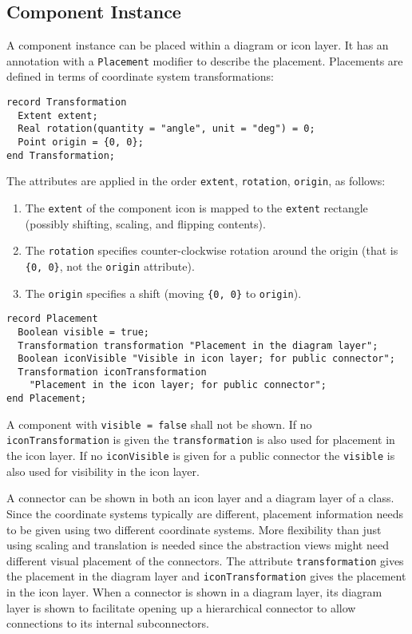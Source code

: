 \subsection{Component Instance}\label{component-instance}

A component instance can be placed within a diagram or icon layer.
It has an annotation with a \lstinline!Placement! modifier to describe the placement.
Placements are defined in terms of coordinate system transformations:
\begin{lstlisting}[language=modelica]
record Transformation
  Extent extent;
  Real rotation(quantity = "angle", unit = "deg") = 0;
  Point origin = {0, 0};
end Transformation;
\end{lstlisting}%
The attributes are applied in the order \lstinline!extent!, \lstinline!rotation!, \lstinline!origin!, as follows:
\begin{enumerate}
\item
  The \lstinline!extent! of the component icon is mapped to the \lstinline!extent! rectangle (possibly shifting, scaling, and flipping contents).
\item
  The \lstinline!rotation! specifies counter-clockwise rotation around the origin (that is \lstinline!{0, 0}!, not the \lstinline!origin! attribute).
\item
  The \lstinline!origin! specifies a shift (moving \lstinline!{0, 0}! to \lstinline!origin!).
\end{enumerate}

\begin{lstlisting}[language=modelica]
record Placement
  Boolean visible = true;
  Transformation transformation "Placement in the diagram layer";
  Boolean iconVisible "Visible in icon layer; for public connector";
  Transformation iconTransformation
    "Placement in the icon layer; for public connector";
end Placement;
\end{lstlisting}%
A component with \lstinline!visible = false! shall not be shown.
If no \lstinline!iconTransformation! is given the \lstinline!transformation! is also used for placement in the icon layer.
If no \lstinline!iconVisible! is given for a public connector the \lstinline!visible! is also used for visibility in the icon layer.

\begin{nonnormative}
A connector can be shown in both an icon layer and a diagram layer of a class.
Since the coordinate systems typically are different, placement information needs to be given using two different coordinate systems.
More flexibility than just using scaling and translation is needed since the abstraction views might need different visual placement of the connectors.
The attribute \lstinline!transformation! gives the placement in the diagram layer and \lstinline!iconTransformation! gives the placement in the icon layer.
When a connector is shown in a diagram layer, its diagram layer is shown to facilitate opening up a hierarchical connector to allow connections to its internal subconnectors.
\end{nonnormative}

